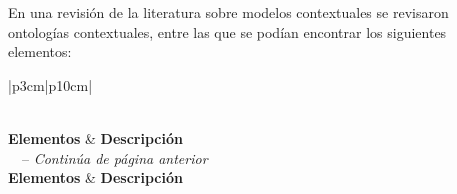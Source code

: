 En una revisi\'on de la literatura sobre modelos contextuales se revisaron ontolog\'ias contextuales, entre las que se pod\'ian encontrar los siguientes elementos:

\begin{center}
\begin{longtable}{|p{3cm}|p{10cm}|}
\caption{Unidades contextuales encontradas en los frameworks revisados.}\\
\hline
\textbf{Elementos} & \textbf{Descripci\'on}\\
\hline
\endfirsthead
{}%
{\tablename\ \thetable\ -- \textit{Contin\'ua de p\'agina anterior}} \\
\hline
\textbf{Elementos} & \textbf{Descripci\'on} \\
\hline
\endhead
\hline {} \\
\endfoot
\hline
\endlastfoot


\end{longtable}
\end{center}
